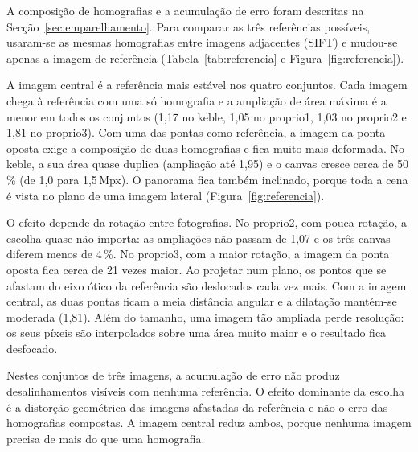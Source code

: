 \documentclass[11pt,a4paper]{article}
\begin{document}
A composição de homografias e a acumulação de erro foram descritas na Secção~\ref{sec:emparelhamento}. Para comparar as três referências possíveis, usaram-se as mesmas homografias entre imagens adjacentes (SIFT) e mudou-se apenas a imagem de referência (Tabela~\ref{tab:referencia} e Figura~\ref{fig:referencia}).

A imagem central é a referência mais estável nos quatro conjuntos. Cada imagem chega à referência com uma só homografia e a ampliação de área máxima é a menor em todos os conjuntos (1,17 no keble, 1,05 no proprio1, 1,03 no proprio2 e 1,81 no proprio3). Com uma das pontas como referência, a imagem da ponta oposta exige a composição de duas homografias e fica muito mais deformada. No keble, a sua área quase duplica (ampliação até 1,95) e o canvas cresce cerca de 50\,\% (de 1,0 para 1,5\,Mpx). O panorama fica também inclinado, porque toda a cena é vista no plano de uma imagem lateral (Figura~\ref{fig:referencia}).

O efeito depende da rotação entre fotografias. No proprio2, com pouca rotação, a escolha quase não importa: as ampliações não passam de 1,07 e os três canvas diferem menos de 4\,\%. No proprio3, com a maior rotação, a imagem da ponta oposta fica cerca de 21 vezes maior. Ao projetar num plano, os pontos que se afastam do eixo ótico da referência são deslocados cada vez mais. Com a imagem central, as duas pontas ficam a meia distância angular e a dilatação mantém-se moderada (1,81). Além do tamanho, uma imagem tão ampliada perde resolução: os seus píxeis são interpolados sobre uma área muito maior e o resultado fica desfocado.

Nestes conjuntos de três imagens, a acumulação de erro não produz desalinhamentos visíveis com nenhuma referência. O efeito dominante da escolha é a distorção geométrica das imagens afastadas da referência e não o erro das homografias compostas. A imagem central reduz ambos, porque nenhuma imagem precisa de mais do que uma homografia.
\end{document}
